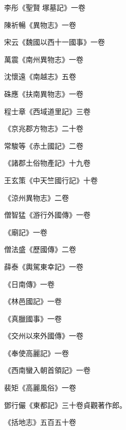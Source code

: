 \begin{pinyinscope}
 李彤《聖賢塚墓記》一卷



 陳祈暢《異物志》一卷



 宋云《魏國以西十一國事》一卷



 萬震《南州異物志》一卷



 沈懷遠《南越志》五卷



 硃應《扶南異物志》一卷



 程士章《西域道里記》三卷



 《京兆郡方物志》二十卷



 常駿等《赤土國記》二卷



 《諸郡土俗物產記》十九卷



 王玄策《中天竺國行記》十卷



 《涼州異物志》二卷



 僧智猛《游行外國傳》一卷



 《廟記》一卷



 僧法盛《歷國傳》二卷



 薛泰《輿駕東幸記》一卷



 《日南傳》一卷



 《林邑國記》一卷



 《真臘國事》一卷



 《交州以來外國傳》一卷



 《奉使高麗記》一卷



 《西南蠻入朝首領記》一卷



 裴矩《高麗風俗》一卷



 鄧行儼《東都記》三十卷貞觀著作郎。



 《括地志》五百五十卷




\end{pinyinscope}

